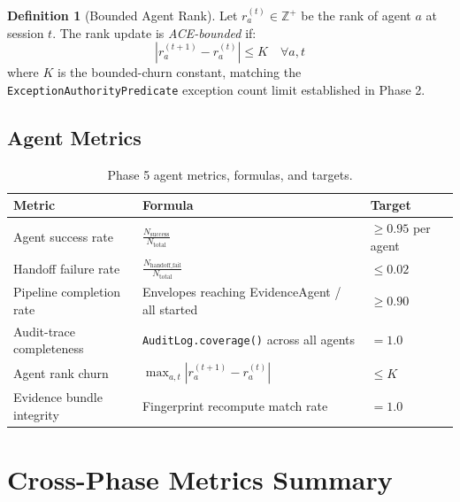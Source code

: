 \documentclass[12pt,letterpaper]{article}
\theoremstyle{definition}
\newtheorem{definition}{Definition}[section]
\theoremstyle{remark}
\begin{document}
\begin{definition}[Bounded Agent Rank]
Let \(r_a^{(t)} \in \mathbb{Z}^+\) be the rank of agent \(a\) at session \(t\). The
rank update is \emph{ACE-bounded} if:
\[
  |r_a^{(t+1)} - r_a^{(t)}| \leq K \quad \forall a, t \tag{22}
\]
where \(K\) is the bounded-churn constant, matching the \texttt{ExceptionAuthorityPredicate}
exception count limit established in Phase 2.
\end{definition}

\subsection{Agent Metrics}

\begin{table}[H]
\centering
\small
\begin{tabular}{@{}lll@{}}
\toprule
\textbf{Metric} & \textbf{Formula} & \textbf{Target} \\
\midrule
Agent success rate & \(\frac{N_{\text{success}}}{N_{\text{total}}}\) & \(\geq 0.95\) per agent \\
Handoff failure rate & \(\frac{N_{\text{handoff\_fail}}}{N_{\text{total}}}\) & \(\leq 0.02\) \\
Pipeline completion rate & Envelopes reaching EvidenceAgent / all started & \(\geq 0.90\) \\
Audit-trace completeness & \texttt{AuditLog.coverage()} across all agents & \(= 1.0\) \\
Agent rank churn & \(\max_{a,t} |r_a^{(t+1)} - r_a^{(t)}|\) & \(\leq K\) \\
Evidence bundle integrity & Fingerprint recompute match rate & \(= 1.0\) \\
\bottomrule
\end{tabular}
\caption{Phase 5 agent metrics, formulas, and targets.}
\end{table}

\newpage

\section{Cross-Phase Metrics Summary}
\end{document}

